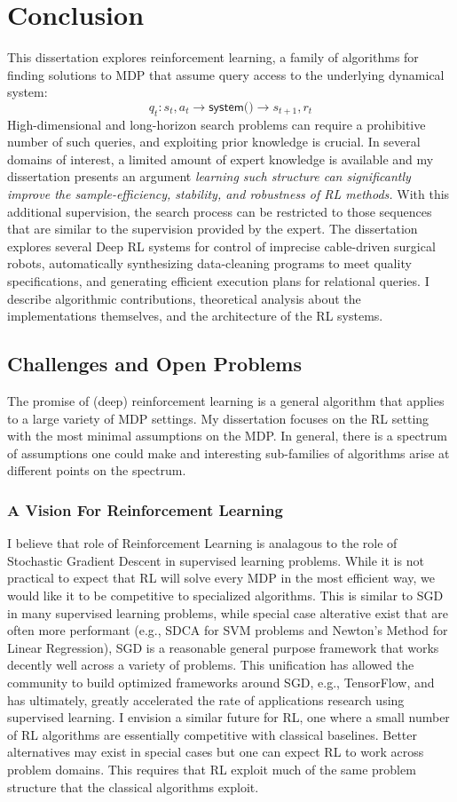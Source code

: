 \chapter{Conclusion}
This dissertation explores reinforcement learning, a family of algorithms for finding solutions to MDP that assume query access to the underlying dynamical system:
\[
q_t: s_t, a_t \rightarrow \textsf{system()} \rightarrow s_{t+1}, r_{t}
\]
High-dimensional and long-horizon search problems can require a prohibitive number of such queries, and exploiting prior knowledge is crucial.
In several domains of interest, a limited amount of expert knowledge is available and my dissertation presents an argument \emph{learning such structure can significantly improve the sample-efficiency, stability, and robustness of RL methods.} 
With this additional supervision, the search process can be restricted to those sequences that are similar to the supervision provided by the expert.
The dissertation explores several Deep RL systems for control of imprecise cable-driven surgical robots, automatically synthesizing data-cleaning programs to meet quality specifications, and generating efficient execution plans for relational queries. I describe algorithmic contributions, theoretical analysis about the implementations themselves, and the architecture of the RL systems.

\section{Challenges and Open Problems}
The promise of (deep) reinforcement learning is a general algorithm that applies to a large variety of MDP settings. 
My dissertation focuses on the RL setting with the most minimal assumptions on the MDP.
In general, there is a spectrum of assumptions one could make and interesting sub-families of algorithms arise at different points on the spectrum.

\subsection*{A Vision For Reinforcement Learning}
I believe that role of Reinforcement Learning is analagous to the role of Stochastic Gradient Descent in supervised learning problems. While it is not practical to expect that RL will solve every MDP in the most efficient way, we would like it to be competitive to specialized algorithms. This is similar to SGD in many supervised learning problems, while special case alterative exist that are often more performant (e.g., SDCA for SVM problems and Newton's Method for Linear Regression), SGD is a reasonable general purpose framework that works decently well across a variety of problems. This unification has allowed the community to build optimized frameworks around SGD, e.g., TensorFlow, and has ultimately, greatly accelerated the rate of applications research using supervised learning. I envision a similar future for RL, one where a small number of RL algorithms are essentially competitive with classical baselines. Better alternatives may exist in special cases but one can expect RL to work across problem domains. This requires that RL exploit much of the same problem structure that the classical algorithms exploit.

